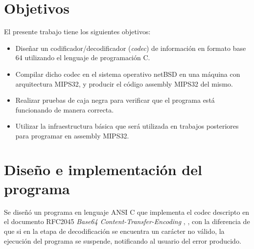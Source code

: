 \section{Objetivos}
El presente trabajo tiene los siguientes objetivos:
\begin{itemize}
    \item Diseñar un codificador/decodificador (\emph{codec}) de información en formato base 64 utilizando el lenguaje de programación C.
    \item Compilar dicho codec en el sistema operativo netBSD en una máquina con arquitectura MIPS32, y producir el código assembly MIPS32 del mismo.
    \item Realizar pruebas de caja negra para verificar que el programa está funcionando de manera correcta.
    \item Utilizar la infraestructura básica que será utilizada en trabajos posteriores para programar en assembly MIPS32.
\end{itemize}
\section{Diseño e implementación del programa}

Se diseñó un programa en lenguaje ANSI C que implementa el codec descripto en el documento RFC2045 \emph{Base64 Content-Transfer-Encoding} \cite{rfc2045}, \cite{wiki_base64}, con la diferencia de que si en la etapa de decodificación se encuentra un carácter no válido, la ejecución del programa se suspende, notificando al usuario del error producido.


